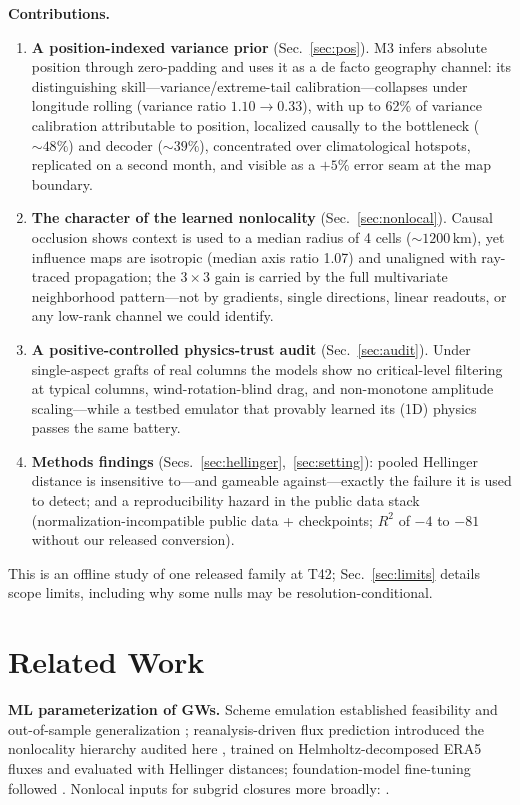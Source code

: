 \documentclass[10pt,twocolumn]{article}
\newcommand{\Mthree}{\mathrm{M3}}
\begin{document}
\textbf{Contributions.}
\begin{enumerate}\itemsep2pt
\item \textbf{A position-indexed variance prior} (Sec.~\ref{sec:pos}). $\Mthree$ infers absolute position through zero-padding and uses it as a de facto geography channel: its distinguishing skill---variance/extreme-tail calibration---collapses under longitude rolling (variance ratio $1.10\!\to\!0.33$), with up to 62\% of variance calibration attributable to position, localized causally to the bottleneck (${\sim}48\%$) and decoder (${\sim}39\%$), concentrated over climatological hotspots, replicated on a second month, and visible as a $+5\%$ error seam at the map boundary.
\item \textbf{The character of the learned nonlocality} (Sec.~\ref{sec:nonlocal}). Causal occlusion shows context is used to a median radius of 4 cells (${\sim}1200$\,km), yet influence maps are isotropic (median axis ratio 1.07) and unaligned with ray-traced propagation; the $3{\times}3$ gain is carried by the full multivariate neighborhood pattern---not by gradients, single directions, linear readouts, or any low-rank channel we could identify.
\item \textbf{A positive-controlled physics-trust audit} (Sec.~\ref{sec:audit}). Under single-aspect grafts of real columns the models show no critical-level filtering at typical columns, wind-rotation-blind drag, and non-monotone amplitude scaling---while a testbed emulator that provably learned its (1D) physics passes the same battery.
\item \textbf{Methods findings} (Secs.~\ref{sec:hellinger},~\ref{sec:setting}): pooled Hellinger distance is insensitive to---and gameable against---exactly the failure it is used to detect; and a reproducibility hazard in the public data stack (normalization-incompatible public data + checkpoints; $R^2$ of $-4$ to $-81$ without our released conversion).
\end{enumerate}

This is an offline study of one released family at T42; Sec.~\ref{sec:limits} details scope limits, including why some nulls may be resolution-conditional.

\section{Related Work}\label{sec:related}

\textbf{ML parameterization of GWs.} Scheme emulation established feasibility and out-of-sample generalization \citep{espinosa2022,hardiman2023}; reanalysis-driven flux prediction introduced the nonlocality hierarchy audited here \citep{gupta2024ml,gupta2025}, trained on Helmholtz-decomposed ERA5 fluxes \citep{gupta2024data} and evaluated with Hellinger distances; foundation-model fine-tuning followed \citep{gupta2025prithvi}. Nonlocal inputs for subgrid closures more broadly: \citet{wang2022}.
\end{document}
